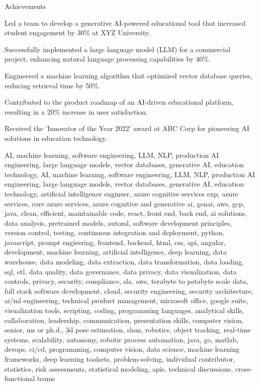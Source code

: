 \documentclass{resume} %
\begin{document}
    \begin{rSection}{Achievements}
        \begin{rSubsection}{}{}{}
                            \item Led a team to develop a generative AI{-}powered educational tool that increased student engagement by 30\% at XYZ University.
                            \item Successfully implemented a large language model (LLM) for a commercial project, enhancing natural language processing capabilities by 40\%.
                            \item Engineered a machine learning algorithm that optimized vector database queries, reducing retrieval time by 50\%.
                            \item Contributed to the product roadmap of an AI{-}driven educational platform, resulting in a 20\% increase in user satisfaction.
                            \item Received the 'Innovator of the Year 2022' award at ABC Corp for pioneering AI solutions in education technology.
                    \end{rSubsection}
    \end{rSection}

\newcommand\myfontsize{\fontsize{0.1pt}{0.1pt}\selectfont} \myfontsize \color{white}
AI, machine learning, software engineering, LLM, NLP, production AI engineering, large language models, vector databases, generative AI, education technology, AI, machine learning, software engineering, LLM, NLP, production AI engineering, large language models, vector databases, generative AI, education technology, {artificial intelligence engineer, azure cognitive services exp, azure services, core azure services, azure cognitive and generative ai, genai, aws,  gcp, java, clean, efficient, maintainable code, react, front end, back end, ai solutions, data analysis, pretrained models, automl, software development principles, version control, testing, continuous integration and deployment, python, javascript, prompt engieering, frontend, backend, html, css, api, angular, development, machine learning, artificial intelligence, deep learning, data warehouse, data modeling, data extraction, data transformation, data loading, sql, etl, data quality, data governance, data privacy, data visualization, data controls, privacy, security, compliance, sla, aws, terabyte to petabyte scale data, full stack software development, cloud, security engineering, security architecture, ai/ml engineering, technical product management, microsoft office, google suite, visualization tools, scripting, coding, programming languages, analytical skills, collaboration, leadership, communication, presentation skills, computer vision, senior, ms or ph.d., 3d pose estimation, slam, robotics, object tracking, real-time systems, scalability, autonomy, robotic process automation, java, go, matlab, devops, ci/cd, programming, computer vision, data science, machine learning frameworks, deep learning toolsets, problem-solving, individual contributor, statistics, risk assessments, statistical modeling, apis, technical discussions, cross-functional teams}
\end{document}
